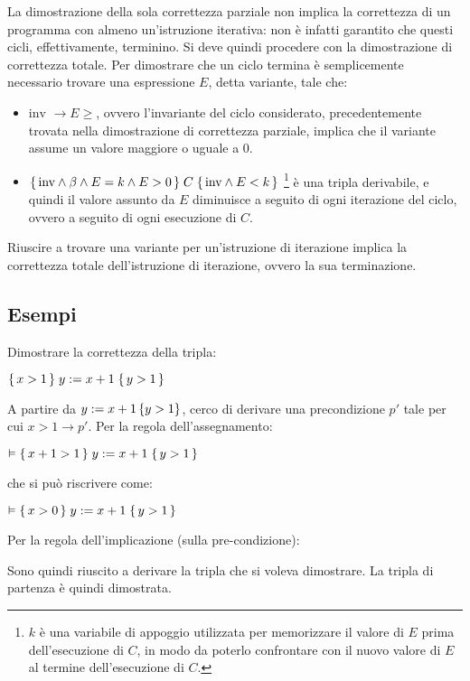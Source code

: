 La dimostrazione della sola correttezza parziale non implica la correttezza
di un programma con almeno un'istruzione iterativa: non è infatti garantito
che questi cicli, effettivamente, terminino. Si deve quindi procedere con
la dimostrazione di correttezza totale.
Per dimostrare che un ciclo termina è semplicemente necessario trovare
una espressione $E$, detta variante, tale che:
\begin{itemize}
    \item $\text{inv } \rightarrow E \ge$, ovvero l'invariante del ciclo considerato,
    precedentemente trovata nella dimostrazione di correttezza parziale,
    implica che il variante assume un valore maggiore o uguale a 0.
    \item $\Hoaretriple{\tn{inv} \land \beta \land E = k \land E > 0}{C}{\tn{inv} \land E < k}$
    \footnote{$k$ è una variabile di appoggio utilizzata per memorizzare
    il valore di $E$ prima dell'esecuzione di $C$, in modo da poterlo
    confrontare con il nuovo valore di $E$ al termine dell'esecuzione di $C$.}
    è una tripla derivabile, e quindi il valore assunto da $E$ diminuisce a
    seguito di ogni iterazione del ciclo, ovvero a seguito di ogni esecuzione
    di $C$.
\end{itemize}
Riuscire a trovare una variante per un'istruzione di iterazione implica la
correttezza totale dell'istruzione di iterazione, ovvero la sua terminazione.

\subsection{Esempi}
\begin{exmp}
    Dimostrare la correttezza della tripla:
    \begin{center}
        $\Hoaretriple{x>1}{y:=x+1}{y>1}$
    \end{center}
    A partire da $y:=x+1 \cbra{y>1}$, cerco di derivare una precondizione
    $p'$ tale per cui $x>1 \rightarrow p'$.
    Per la regola dell'assegnamento:
    \begin{center}
        $\vDash \Hoaretriple{x+1>1}{y:=x+1}{y>1}$
    \end{center}
    che si può riscrivere come:
    \begin{center}
        $\vDash \Hoaretriple{x>0}{y:=x+1}{y>1}$
    \end{center}
    Per la regola dell'implicazione (sulla pre-condizione):
    \begin{center}
        \begin{prooftree}
        \end{prooftree}
    \end{center}
    Sono quindi riuscito a derivare la tripla che si voleva dimostrare.
    La tripla di partenza è quindi dimostrata.
\end{exmp}

